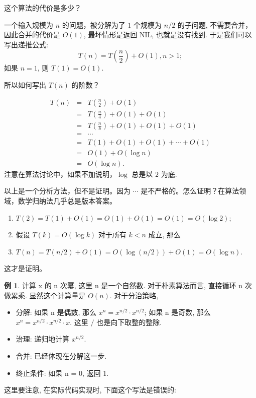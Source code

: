 \documentclass[a4paper]{ctexart}
\theoremstyle{definition}
\theoremstyle{definition}
\newtheorem{example}{例}[section]
\begin{document}
这个算法的代价是多少？

一个输入规模为 $n$ 的问题，被分解为了 $1$ 个规模为 $n/2$ 的子问题, 不需要合并，因此合并的代价是 $O(1)$, 最坏情形是返回 NIL, 也就是没有找到. 
于是我们可以写出递推公式:
$$
T(n) = T(\frac{n}{2}) + O(1), n > 1;
$$
如果 $n = 1$, 则 $T(1) = O(1)$.

所以如何写出 $T(n)$ 的阶数？

\begin{eqnarray*}
T(n) &=& T(\frac{n}{2}) + O(1) \\
&=& T(\frac{n}{4}) + O(1) + O(1) \\
&=& T(\frac{n}{8}) + O(1) + O(1) + O(1) \\
&=& \cdots \\
&=& T(1) + O(1) + O(1) + \cdots + O(1) \\
&=& O(1) + O(\log n) \\
&=& O(\log n).
\end{eqnarray*}
注意在算法讨论中，如果不加说明，$\log$ 总是以 $2$ 为底. 

以上是一个分析方法，但不是证明。因为 $\cdots$ 是不严格的。怎么证明？在算法领域，数学归纳法几乎总是版本答案。

\begin{enumerate}
  \item $T(2) = T(1) + O(1) = O(1) + O(1) = O(1) = O(\log 2)$;
  \item 假设 $T(k) = O(\log k)$ 对于所有 $k < n$ 成立, 那么
  \item $T(n) = T(n/2) + O(1) = O(\log (n/2)) + O(1) = O(\log n)$.
\end{enumerate}

这才是证明。

\begin{example}
  计算 x 的 n 次幂, 这里 n 是一个自然数. 对于朴素算法而言, 直接循环 n 次做累乘. 显然这个计算量是 $O(n)$. 对于分治策略, 
  \begin{itemize}
    \item 分解: 如果 n 是偶数, 那么 $x^n = x^{n / 2} \cdot x^{n / 2}$; 如果 n 是奇数, 那么 $x^n = x^{n / 2} \cdot x^{n / 2} \cdot x$. 这里 $/$ 也是向下取整的整除. 
    \item 治理: 递归地计算 $x^{n / 2}$.
    \item 合并: 已经体现在分解这一步. 
    \item 终止条件: 如果 n = 0, 返回 1.
  \end{itemize}
\end{example}

这里要注意, 在实际代码实现时, 下面这个写法是错误的:
\end{document}

